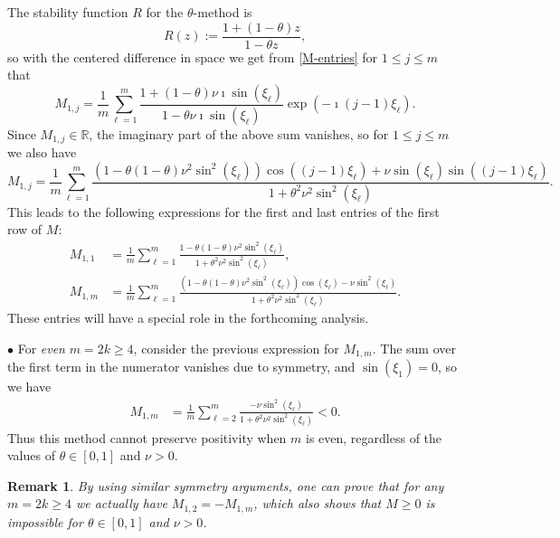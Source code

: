 \documentclass[a4paper]{article}
\newtheorem{remark}{Remark}
\newcommand{\te}{\theta}
\begin{document}
 The stability function $R$ for the $\theta$-method is \cite[Chapter IV.3]{hairerwanner}
\[
    R(z)  := \frac{1+(1-\theta)z}{1-\theta z},
\]
so with the centered difference in space we get from \eqref{M-entries} for $1\le j\le m$ that
\[
    M_{1,j} = \frac{1}{m} \sum_{\ell=1}^m \frac{1+(1-\theta)\nu \imath\sin(\xi_\ell)}{1-\theta\nu \imath\sin(\xi_\ell)}\exp\left(-\imath(j-1)\xi_\ell\right).
\]
Since $ M_{1,j}\in\mathbb{R}$, the imaginary part of the above sum vanishes, so for $1\le j\le m$ we also have
\[
  M_{1,j}  = \frac{1}{m} \sum_{\ell=1}^{m} \frac{(1-\theta(1-\theta)\nu^2\sin^2(\xi_\ell))\cos((j-1)\xi_\ell)+ \nu \sin(\xi_\ell)\sin((j-1)\xi_\ell)}{1+\theta^2\nu^2 \sin^2(\xi_\ell)}.
\]
This leads to the following expressions for the first and last entries of the first
row of $M$:
\begin{align*} 
    M_{1,1} & = \frac{1}{m} \sum_{\ell=1}^m \frac{1-\theta(1-\theta)\nu^2\sin^2(\xi_\ell)}{1+\theta^2\nu^2\sin^2(\xi_\ell)}, \\
    M_{1,m} & = \frac{1}{m} \sum_{\ell=1}^m \frac{(1-\theta(1-\theta)\nu^2\sin^2(\xi_\ell))\cos(\xi_\ell)- \nu \sin^2 (\xi_\ell)}{1+\theta^2\nu^2 \sin^2 (\xi_\ell)}.
\end{align*}
These entries will have a special role in the forthcoming analysis. 

$\bullet$ For \emph{even} $m=2k\ge 4$, consider the previous expression for $M_{1,m}$. The sum over the first term in the numerator vanishes due to symmetry, and $\sin(\xi_1)=0$, so we have
\begin{align*}
    M_{1,m} & =  \frac{1}{m} \sum_{\ell=2}^{m} \frac{- \nu \sin^2 (\xi_\ell)}{1+\theta^2\nu^2 \sin^2 (\xi_\ell)} < 0.
\end{align*}
Thus this method cannot preserve positivity when $m$ is even, regardless of the values
of $\theta\in[0,1]$ and $\nu>0$.
\begin{remark}
By using similar symmetry arguments, one can prove that for any $m=2k\ge 4$ we actually have
$M_{1,2}=-M_{1,m}$, which also shows that $M\ge 0$ is impossible for $\te\in[0,1]$ and $\nu>0$.
\end{remark}
\end{document}
